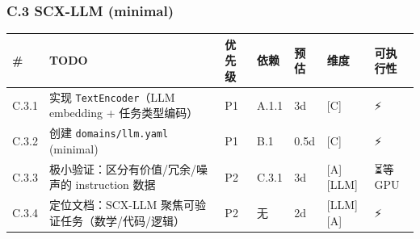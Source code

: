 \documentclass[
  12pt,
]{ctexart}
\begin{document}
\subsubsection{C.3 SCX-LLM (minimal)}\label{c.3-scx-llm-minimal}

\begin{longtable}[]{@{}
  >{\raggedright\arraybackslash}p{}
  >{\raggedright\arraybackslash}p{}
  >{\raggedright\arraybackslash}p{}
  >{\raggedright\arraybackslash}p{}
  >{\raggedright\arraybackslash}p{}
  >{\raggedright\arraybackslash}p{}
  >{\raggedright\arraybackslash}p{}@{}}
\toprule\noalign{}
\begin{minipage}[b]{\linewidth}\raggedright
\#
\end{minipage} & \begin{minipage}[b]{\linewidth}\raggedright
TODO
\end{minipage} & \begin{minipage}[b]{\linewidth}\raggedright
优先级
\end{minipage} & \begin{minipage}[b]{\linewidth}\raggedright
依赖
\end{minipage} & \begin{minipage}[b]{\linewidth}\raggedright
预估
\end{minipage} & \begin{minipage}[b]{\linewidth}\raggedright
维度
\end{minipage} & \begin{minipage}[b]{\linewidth}\raggedright
可执行性
\end{minipage} \\
\midrule\noalign{}
\endhead
\bottomrule\noalign{}
\endlastfoot
C.3.1 & 实现 \texttt{TextEncoder}（LLM embedding + 任务类型编码） & P1 &
A.1.1 & 3d & {[}C{]} & ⚡ \\
C.3.2 & 创建 \texttt{domains/llm.yaml} (minimal) & P1 & B.1 & 0.5d &
{[}C{]} & ⚡ \\
C.3.3 & 极小验证：区分有价值/冗余/噪声的 instruction 数据 & P2 & C.3.1 &
3d & {[}A{]}{[}LLM{]} & ⏳等 GPU \\
C.3.4 & 定位文档：SCX-LLM 聚焦可验证任务（数学/代码/逻辑） & P2 & 无 &
2d & {[}LLM{]}{[}A{]} & ⚡ \\
\end{longtable}
\end{document}
